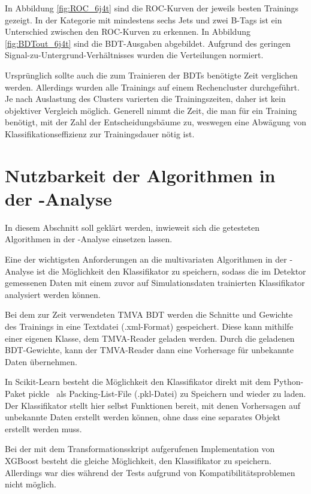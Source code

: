 In Abbildung \ref{fig:ROC_6j4t} sind die ROC-Kurven der jeweils besten Trainings gezeigt. In der Kategorie mit mindestens sechs Jets und zwei B-Tags ist ein Unterschied zwischen den ROC-Kurven zu erkennen. In Abbildung \ref{fig:BDTout_6j4t} sind die BDT-Ausgaben abgebildet. Aufgrund des geringen Signal-zu-Untergrund-Verh\"altnisses wurden die Verteilungen normiert.

Urspr\"unglich sollte auch die zum Trainieren der BDTs ben\"otigte Zeit verglichen werden. Allerdings wurden alle Trainings auf einem Rechencluster durchgef\"uhrt. Je nach Auslastung des Clusters varierten die Trainingszeiten, daher ist kein objektiver Vergleich m\"oglich. Generell nimmt die Zeit, die man f\"ur ein Training ben\"otigt, mit der Zahl der Entscheidungsb\"aume zu, weswegen eine Abw\"agung von Klassifikationseffizienz zur Trainingsdauer n\"otig ist.

\section{Nutzbarkeit der Algorithmen in der \ttH-Analyse}
\label{ch:Vergleich:sec:ttH}

In diesem Abschnitt soll gekl\"art werden, inwieweit sich die getesteten Algorithmen in der \ttH-Analyse einsetzen lassen.

Eine der wichtigsten Anforderungen an die multivariaten Algorithmen in der \ttH-Analyse ist die M\"oglichkeit den Klassifikator zu speichern, sodass die im Detektor gemessenen Daten mit einem zuvor auf Simulationsdaten trainierten Klassifikator analysiert werden k\"onnen.

Bei dem zur Zeit verwendeten TMVA BDT werden die Schnitte und Gewichte des Trainings in eine Textdatei (.xml-Format) gespeichert. Diese kann mithilfe einer eigenen Klasse, dem TMVA-Reader geladen werden. Durch die geladenen BDT-Gewichte, kann der TMVA-Reader dann eine Vorhersage f\"ur unbekannte Daten \"ubernehmen.

In Scikit-Learn besteht die M\"oglichkeit den Klassifikator direkt mit dem Python-Paket \glqq pickle\grqq~ als Packing-List-File (.pkl-Datei) zu Speichern und wieder zu laden. Der Klassifikator stellt hier selbst Funktionen bereit, mit denen Vorhersagen auf unbekannte Daten erstellt werden k\"onnen, ohne dass eine separates Objekt erstellt werden muss.

Bei der mit dem Transformationsskript aufgerufenen Implementation von XGBoost besteht die gleiche M\"oglichkeit, den Klassifikator zu speichern. Allerdings war dies w\"ahrend der Tests aufgrund von Kompatibilit\"atsproblemen nicht m\"oglich.

